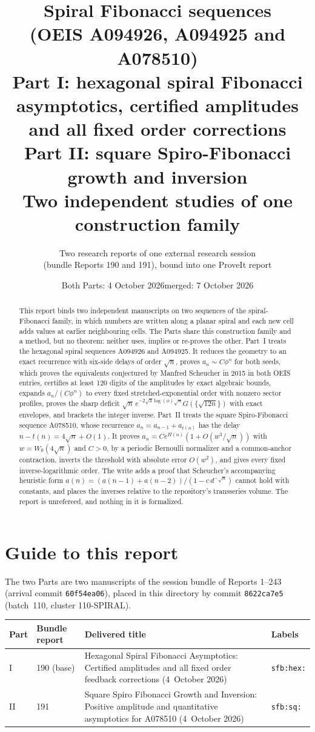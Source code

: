 \documentclass[11pt]{article}
\title{\textbf{Spiral Fibonacci sequences\\ (OEIS A094926, A094925 and A078510)}\\[7pt]
\large Part I: hexagonal spiral Fibonacci asymptotics, certified amplitudes\\ and all fixed order corrections\\[3pt]
Part II: square Spiro-Fibonacci growth and inversion\\[3pt]
\normalsize Two independent studies of one construction family}
\author{Two research reports of one external research session\\(bundle Reports 190 and 191), bound into one ProveIt report}
\date{Both Parts: 4 October 2026\quad merged: 7 October 2026}
\theoremstyle{remark}\newtheorem{remark}[theorem]{Remark}
\begin{document}
\hypersetup{pageanchor=false}
\maketitle
\begin{abstract}
This report binds two independent manuscripts on two sequences of the spiral-Fibonacci family, in which numbers are written along a planar spiral and each new cell adds values at earlier neighbouring cells. The Parts share this construction family and a method, but no theorem: neither uses, implies or re-proves the other. Part~I treats the hexagonal spiral sequences A094926 and A094925. It reduces the geometry to an exact recurrence with six-side delays of order $\sqrt n$, proves $a_n\sim C\phi^n$ for both seeds, which proves the equivalents conjectured by Manfred Scheucher in 2015 in both OEIS entries, certifies at least 120 digits of the amplitudes by exact algebraic bounds, expands $a_n/(C\phi^n)$ to every fixed stretched-exponential order with nonzero sector profiles, proves the sharp deficit $\sqrt n\,e^{-2\sqrt3\log(\phi)\sqrt n}G(\{\sqrt{12n}\})$ with exact envelopes, and brackets the integer inverse. Part~II treats the square Spiro-Fibonacci sequence A078510, whose recurrence $a_n=a_{n-1}+a_{t(n)}$ has the delay $n-t(n)=4\sqrt n+O(1)$. It proves $a_n=Ce^{H(n)}(1+O(w^3/\sqrt n))$ with $w=W_0(4\sqrt n)$ and $C>0$, by a periodic Bernoulli normalizer and a common-anchor contraction, inverts the threshold with absolute error $O(w^2)$, and gives every fixed inverse-logarithmic order. The write adds a proof that Scheucher's accompanying heuristic form $a(n)=(a(n-1)+a(n-2))/(1-c\,d^{-\sqrt n})$ cannot hold with constants, and places the inverses relative to the repository's transseries volume. The report is unrefereed, and nothing in it is formalized.
\end{abstract}
\hypersetup{pageanchor=true}
{\small\setlength{\parskip}{0pt}\tableofcontents}
\newpage

\section*{Guide to this report}\label{sfb:sec:guide}
The two Parts are two manuscripts of the session bundle of Reports 1--243
(arrival commit \texttt{60f54ea06}), placed in this directory by commit
\texttt{8622ca7e5} (batch~110, cluster 110-SPIRAL).
\begin{center}
\small
\begin{tabular}{@{}l l >{\raggedright\arraybackslash}p{} l@{}}
\toprule
Part & Bundle report & Delivered title & Labels\\
\midrule
I & 190 (base) & Hexagonal Spiral Fibonacci Asymptotics: Certified amplitudes and all fixed order feedback corrections (4~October 2026) & \texttt{sfb:hex:}\\
II & 191 & Square Spiro Fibonacci Growth and Inversion: Positive amplitude and quantitative asymptotics for A078510 (4~October 2026) & \texttt{sfb:sq:}\\
\bottomrule
\end{tabular}
\end{center}
\end{document}
